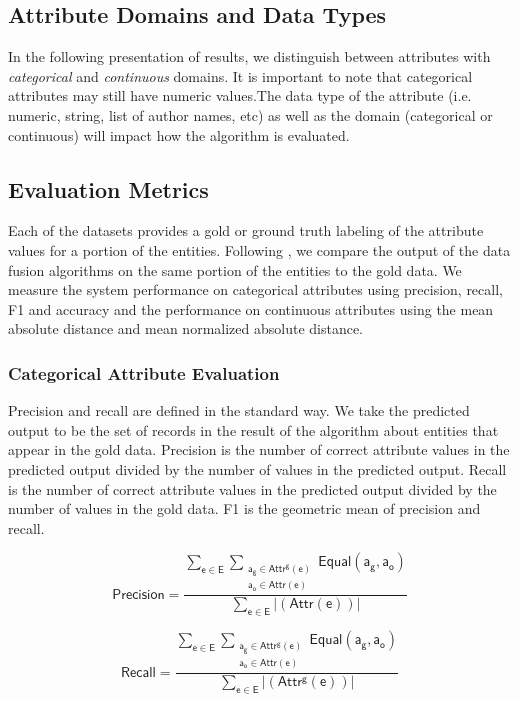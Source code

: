 \documentclass{acm_proc_article-sp}
\begin{document}
\subsection{Attribute Domains and Data Types}

In the following presentation of results, we distinguish between attributes with  \emph{categorical} and \emph{continuous} domains. It is important to note that categorical attributes may still have numeric values.The data type of the attribute (i.e. numeric, string, list of author names, etc) as well as the domain (categorical or continuous) will impact how the algorithm is evaluated. 

\subsection{Evaluation Metrics}

Each of the datasets provides a gold or ground truth labeling of the attribute values for a portion of the entities. Following \cite{li:truth,li:resolving,waguih:truth,dong:integrating}, we compare the output of the data fusion algorithms on the same portion of the entities to the gold data. We measure the system performance on categorical attributes using precision, recall, F1 and accuracy and the performance on continuous attributes using  the mean absolute distance and mean normalized absolute distance. 

\subsubsection{Categorical Attribute Evaluation}

Precision and recall are defined in the standard way. We take the predicted output to be the set of records in the result of the algorithm about entities  that appear in the gold data. Precision is the number of correct attribute values in the predicted output divided by the number of values in the predicted output. Recall is the number of correct attribute values in the predicted output divided by the number of values in the gold data. F1 is the geometric mean of precision and recall. 


\begin{equation}
\mathsf {Precision =\frac {\sum_{e \in E}  \sum_{\substack{a_g \in Attr^g(e) \\ a_o \in Attr(e)}} \mathsf{Equal}(a_g,a_o)}{\sum_{e \in E}  |(Attr(e))| }}
\end{equation}


 \begin{equation}
\mathsf {Recall =\frac {\sum_{e \in E}  \sum_{\substack{a_g \in Attr^g(e) \\ a_o \in Attr(e)}} \mathsf{Equal}(a_g,a_o)} {\sum_{e \in E}  |(Attr^g(e))| }}
\end{equation}
\end{document}

